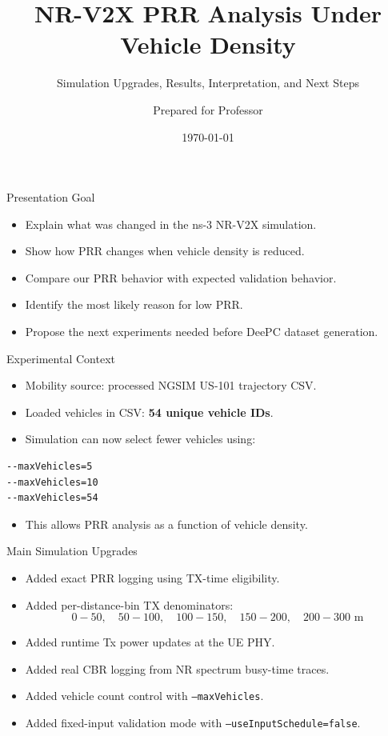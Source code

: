 \documentclass[aspectratio=169,11pt]{beamer}
\title[PRR Density Analysis]{NR-V2X PRR Analysis Under Vehicle Density}
\subtitle{Simulation Upgrades, Results, Interpretation, and Next Steps}
\author{Prepared for Professor}
\institute{ns-3 NR-V2X / DeePC Dataset Study}
\date{\today}
\begin{document}
\begin{frame}
  \titlepage
\end{frame}

\begin{frame}{Presentation Goal}
\large
\begin{itemize}
  \item Explain what was changed in the ns-3 NR-V2X simulation.
  \item Show how PRR changes when vehicle density is reduced.
  \item Compare our PRR behavior with expected validation behavior.
  \item Identify the most likely reason for low PRR.
  \item Propose the next experiments needed before DeePC dataset generation.
\end{itemize}
\end{frame}

\begin{frame}[fragile]{Experimental Context}
\large
\begin{itemize}
  \item Mobility source: processed NGSIM US-101 trajectory CSV.
  \item Loaded vehicles in CSV: \textbf{54 unique vehicle IDs}.
  \item Simulation can now select fewer vehicles using:
\end{itemize}

\vspace{0.3cm}
\begin{lstlisting}
--maxVehicles=5
--maxVehicles=10
--maxVehicles=54
\end{lstlisting}

\vspace{0.2cm}
\large
\begin{itemize}
  \item This allows PRR analysis as a function of vehicle density.
\end{itemize}
\end{frame}

\begin{frame}{Main Simulation Upgrades}
\large
\begin{itemize}
  \item Added exact PRR logging using TX-time eligibility.
  \item Added per-distance-bin TX denominators:
  \[
    0-50,\quad 50-100,\quad 100-150,\quad 150-200,\quad 200-300 \text{ m}
  \]
  \item Added runtime Tx power updates at the UE PHY.
  \item Added real CBR logging from NR spectrum busy-time traces.
  \item Added vehicle count control with \texttt{--maxVehicles}.
  \item Added fixed-input validation mode with \texttt{--useInputSchedule=false}.
\end{itemize}
\end{frame}
\end{document}
